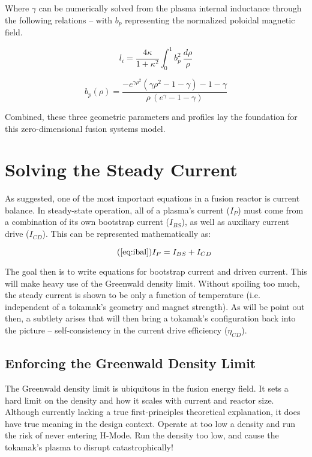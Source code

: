 \documentclass[11pt]{book}
\begin{document}
Where $\gamma$ can be numerically solved from the plasma internal inductance through the following relations -- with $b_p$ representing the normalized poloidal magnetic field.

\begin{equation}
	l_i = \frac{4 \kappa}{1+\kappa^2}	 \int_0^1 b_p^2 \ \frac{d\rho}{\rho}
\end{equation}

\begin{equation}
	\label{eq:b_p}
	b_p(\rho) = \frac{ -e^{\gamma\rho^2} ( \gamma\rho^2 - 1 - \gamma ) - 1 - \gamma }{\rho \,( e^\gamma - 1 - \gamma ) }
\end{equation}

Combined, these three geometric parameters and profiles lay the foundation for this zero-dimensional fusion systems model.

\section{Solving the Steady Current}

As suggested, one of the most important equations in a fusion reactor is current balance. In steady-state operation, all of a plasma's current ($I_P$) must come from a combination of its own bootstrap current ($I_{BS}$), as well as auxiliary current drive ($I_{CD}$). This can be represented mathematically as:

\begin{equation}
	\tag{\ref{eq:ibal}}
	I_P = I_{BS} + I_{CD}
\end{equation}

The goal then is to write equations for bootstrap current and driven current. This will make heavy use of the Greenwald density limit. Without spoiling too much, the steady current is shown to be only a function of temperature (i.e. independent of a tokamak's geometry and magnet strength). As will be point out then, a subtlety arises that will then bring a tokamak's configuration back into the picture -- self-consistency in the current drive efficiency ($\eta_{CD}$).

\subsection{Enforcing the Greenwald Density Limit}

The Greenwald density limit is ubiquitous in the fusion energy field. It sets a hard limit on the density and how it scales with current and reactor size. Although currently lacking a true first-principles theoretical explanation, it does have true meaning in the design context. Operate at too low a density and run the risk of never entering H-Mode. Run the density too low, and cause the tokamak's plasma to disrupt catastrophically!
\end{document}
